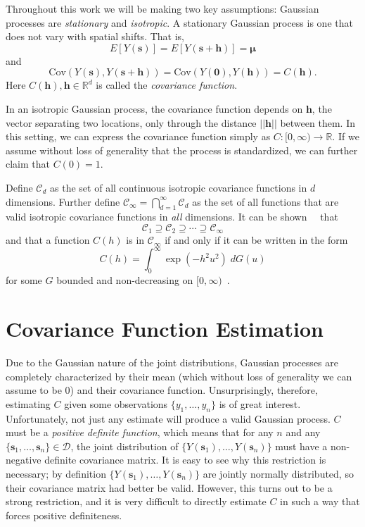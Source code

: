 Throughout this work we will be making two key assumptions: Gaussian processes are \emph{stationary} and \emph{isotropic}. A stationary Gaussian process is one that does not vary with spatial shifts. That is,
\[
E[Y(\bm{s})] = E[Y(\bm{s} + \bm{h})] = \bm{\mu}
\]
and
\[
\textrm{Cov}(Y(\bm{s}), Y(\bm{s} + \bm{h})) = \textrm{Cov}(Y(\bm{0}), Y(\bm{h})) = C(\bm{h}).
\]
Here $C(\bm{h}), \bm{h} \in \mathbb{R}^d$ is called the \emph{covariance function}.

In an isotropic Gaussian process, the covariance function depends on $\bm{h}$, the vector separating two locations, only through the distance $||\bm{h}||$ between them. In this setting, we can express the covariance function simply as $C: [0, \infty) \to \mathbb{R}$. If we assume without loss of generality that the process is standardized, we can further claim that $C(0) = 1$.

Define $\mathcal{C}_d$ as the set of all continuous isotropic covariance functions in $d$ dimensions. Further define $\mathcal{C}_\infty = \bigcap_{d=1}^\infty \mathcal{C}_d$ as the set of all functions that are valid isotropic covariance functions in \emph{all} dimensions. It can be shown~\cite{Stein1999}~\cite{schoenberg1938metric} that
\[
	\mathcal{C}_1 \supseteq \mathcal{C}_2 \supseteq \cdots \supseteq \mathcal{C}_\infty
\]
and that a function $C(h)$ is in $\mathcal{C}_\infty$ if and only if it can be written in the form
\[
	C(h) = \int_0^\infty \exp(-h^2u^2) \; dG(u)
\]
for some $G$ bounded and non-decreasing on $[0, \infty)$~\cite{Stein1999}.


\section{Covariance Function Estimation} %
\label{sec:covariance_function_estimation}

Due to the Gaussian nature of the joint distributions, Gaussian processes are completely characterized by their mean (which without loss of generality we can assume to be 0) and their covariance function. Unsurprisingly, therefore, estimating $C$ given some observations $\{y_1, \dots, y_n\}$ is of great interest. Unfortunately, not just any estimate will produce a valid Gaussian process. $C$ must be a \emph{positive definite function}, which means that for any $n$ and any $\{\bm{s}_1, \dots, \bm{s}_n\} \in \mathcal{D}$, the joint distribution of $\{Y(\bm{s}_1), \dots, Y(\bm{s}_n)\}$ must have a non-negative definite covariance matrix. It is easy to see why this restriction is necessary; by definition $\{Y(\bm{s}_1), \dots, Y(\bm{s}_n)\}$ are jointly normally distributed, so their covariance matrix had better be valid. However, this turns out to be a strong restriction, and it is very difficult to directly estimate $C$ in such a way that forces positive definiteness.

